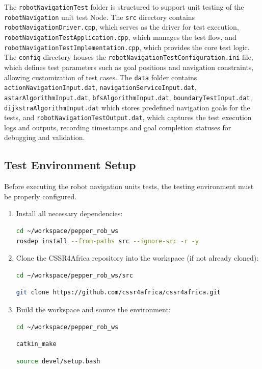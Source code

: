 \documentclass{CSSRforAfrica}
\begin{document}
\noindent The \texttt{robotNavigationTest} folder is structured to support unit testing of the \verb|robotNavigation| unit test Node. The \texttt{src} directory contains \texttt{robotNavigationDriver.cpp}, which serves as the driver for test execution, \texttt{robotNavigationTestApplication.cpp}, which manages the test flow, and \texttt{robotNavigationTestImplementation.cpp}, which provides the core test logic.\\


\noindent The \texttt{config} directory houses the \texttt{robotNavigationTestConfiguration.ini} file, which defines test parameters such as goal positions and navigation constraints, allowing customization of test cases. The \texttt{data} folder contains \texttt{actionNavigationInput.dat}, \texttt{navigationServiceInput.dat}, \texttt{astarAlgorithmInput.dat}, \texttt{bfsAlgorithmInput.dat}, \texttt{boundaryTestInput.dat}, \texttt{dijkstraAlgorithmInput.dat} which stores predefined navigation goals for the tests, and \texttt{robotNavigationTestOutput.dat}, which captures the test execution logs and outputs, recording timestamps and goal completion statuses for debugging and validation.



\subsection{Test Environment Setup}
Before executing the robot navigation units tests, the testing environment must be properly configured.

\begin{enumerate}
\item Install all necessary dependencies:
\begin{lstlisting}[style=withoutNumbering, language=bash]
cd ~/workspace/pepper_rob_ws
rosdep install --from-paths src --ignore-src -r -y
\end{lstlisting}

\item Clone the CSSR4Africa repository into the workspace (if not already cloned):
\begin{lstlisting}[style=withoutNumbering, language=bash]
cd ~/workspace/pepper_rob_ws/src
\end{lstlisting}
\begin{lstlisting}[style=withoutNumbering, language=bash]
git clone https://github.com/cssr4africa/cssr4africa.git
\end{lstlisting}
\item Build the workspace and source the environment:
\begin{lstlisting}[style=withoutNumbering, language=bash]
cd ~/workspace/pepper_rob_ws
\end{lstlisting}

\begin{lstlisting}[style=withoutNumbering, language=bash]
catkin_make
\end{lstlisting}

\begin{lstlisting}[style=withoutNumbering, language=bash]
source devel/setup.bash
\end{lstlisting}
\end{enumerate}
\end{document}
